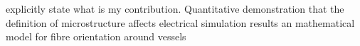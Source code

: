 
explicitly state what is my contribution. 
Quantitative demonstration that the definition of microstructure affects electrical simulation results
an mathematical model for fibre orientation around vessels

